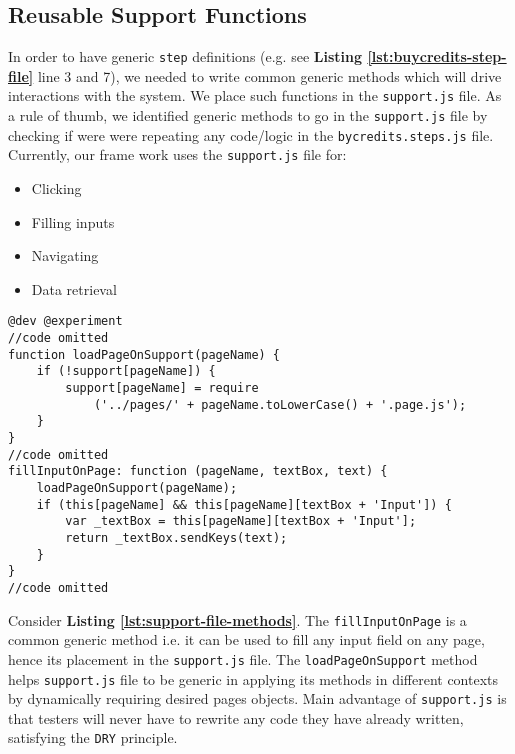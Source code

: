 \subsection{Reusable Support Functions}
\label{subsec:reusable-support-functions}

In order to have generic \texttt{step} definitions (e.g. see \textbf{Listing \ref{lst:buycredits-step-file}} line 3 and 7), we needed to write common generic methods which will drive interactions with the system. We place such functions in the \texttt{support.js} file. As a rule of thumb, we identified generic methods to go in the \texttt{support.js} file by checking if were were repeating any code/logic in the \texttt{bycredits.steps.js} file. Currently, our frame work uses the \texttt{support.js} file for:

\begin{itemize}
\item Clicking
\item Filling inputs
\item Navigating
\item Data retrieval
\end{itemize}

\begin{listing}[H]
\begin{verbatim}
@dev @experiment
//code omitted
function loadPageOnSupport(pageName) {
    if (!support[pageName]) {
        support[pageName] = require
            ('../pages/' + pageName.toLowerCase() + '.page.js');
    }
}
//code omitted
fillInputOnPage: function (pageName, textBox, text) {
    loadPageOnSupport(pageName);
    if (this[pageName] && this[pageName][textBox + 'Input']) {
        var _textBox = this[pageName][textBox + 'Input'];
        return _textBox.sendKeys(text);
    }
}
//code omitted
\end{verbatim}
\label{lst:support-file-methods}
\end{listing}

Consider \textbf{Listing \ref{lst:support-file-methods}}. The \texttt{fillInputOnPage} is a common generic method i.e. it can be used to fill any input field on any page, hence its placement in the \texttt{support.js} file. The \texttt{loadPageOnSupport} method helps \texttt{support.js} file to be generic in applying its methods in different contexts by dynamically requiring desired pages objects. Main advantage of \texttt{support.js} is that testers will never have to rewrite any code they have already written, satisfying the \texttt{DRY} principle.

